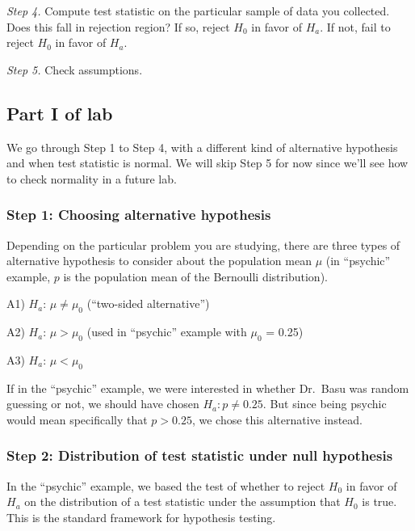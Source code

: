 \documentclass[]{article}
\begin{document}
\emph{Step 4.} Compute test statistic on the particular sample of data
you collected. Does this fall in rejection region? If so, reject \(H_0\)
in favor of \(H_a\). If not, fail to reject \(H_0\) in favor of \(H_a\).

\emph{Step 5.} Check assumptions.

\hypertarget{part-i-of-lab}{%
\subsection{Part I of lab}\label{part-i-of-lab}}

We go through Step 1 to Step 4, with a different kind of alternative
hypothesis and when test statistic is normal. We will skip Step 5 for
now since we'll see how to check normality in a future lab.

\hypertarget{step-1-choosing-alternative-hypothesis}{%
\subsubsection{Step 1: Choosing alternative
hypothesis}\label{step-1-choosing-alternative-hypothesis}}

Depending on the particular problem you are studying, there are three
types of alternative hypothesis to consider about the population mean
\(\mu\) (in ``psychic'' example, \(p\) is the population mean of the
Bernoulli distribution).

A1) \(H_{a}\): \(\mu \neq \mu_0\) (``two-sided alternative'')

A2) \(H_{a}\): \(\mu > \mu_0\) (used in ``psychic'' example with
\(\mu_0\) = 0.25)

A3) \(H_{a}\): \(\mu < \mu_0\)

If in the ``psychic'' example, we were interested in whether Dr.~Basu
was random guessing or not, we should have chosen \(H_a:p\neq0.25\). But
since being psychic would mean specifically that \(p>0.25\), we chose
this alternative instead.

\hypertarget{step-2-distribution-of-test-statistic-under-null-hypothesis}{%
\subsubsection{Step 2: Distribution of test statistic under null
hypothesis}\label{step-2-distribution-of-test-statistic-under-null-hypothesis}}

In the ``psychic'' example, we based the test of whether to reject
\(H_0\) in favor of \(H_a\) on the distribution of a test statistic
under the assumption that \(H_0\) is true. This is the standard
framework for hypothesis testing.
\end{document}
